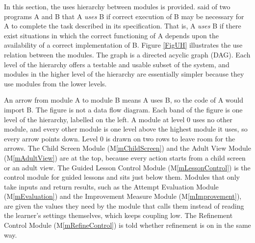 \documentclass[12pt, titlepage]{article}
\newcommand{\mref}[1]{M\ref{#1}}
\begin{document}
In this section, the uses hierarchy between modules is provided.
\citet{Parnas1978} said of two programs A and B that A {\em uses} B if correct
execution of B may be necessary for A to complete the task described in its
specification. That is, A {\em uses} B if there exist situations in which the
correct functioning of A depends upon the availability of a correct
implementation of B.  Figure \ref{FigUH} illustrates the use relation between
the modules. The graph is a directed acyclic graph (DAG). Each level of the
hierarchy offers a testable and usable subset of the system, and modules in the
higher level of the hierarchy are essentially simpler because they use modules
from the lower levels.

An arrow from module A to module B means A uses B, so the code of A would import
B. The figure is not a data flow diagram. Each band of the figure is one level
of the hierarchy, labelled on the left. A module at level 0 uses no other
module, and every other module is one level above the highest module it uses,
so every arrow points down. Level 0 is drawn on two rows to leave room for the
arrows. The Child
Screen Module (\mref{mChildScreen}) and the Adult View Module
(\mref{mAdultView}) are at the top, because every action starts from a child
screen or an adult view. The Guided Lesson Control Module
(\mref{mLessonControl}) is the control module for guided lessons and sits just
below them. Modules that only take inputs and return results, such as the
Attempt Evaluation Module (\mref{mEvaluation}) and the Improvement Measure
Module (\mref{mImprovement}), are given the values they need by the module that
calls them instead of reading the learner's settings themselves, which keeps
coupling low. The Refinement Control Module (\mref{mRefineControl}) is told
whether refinement is on in the same way.
\end{document}
